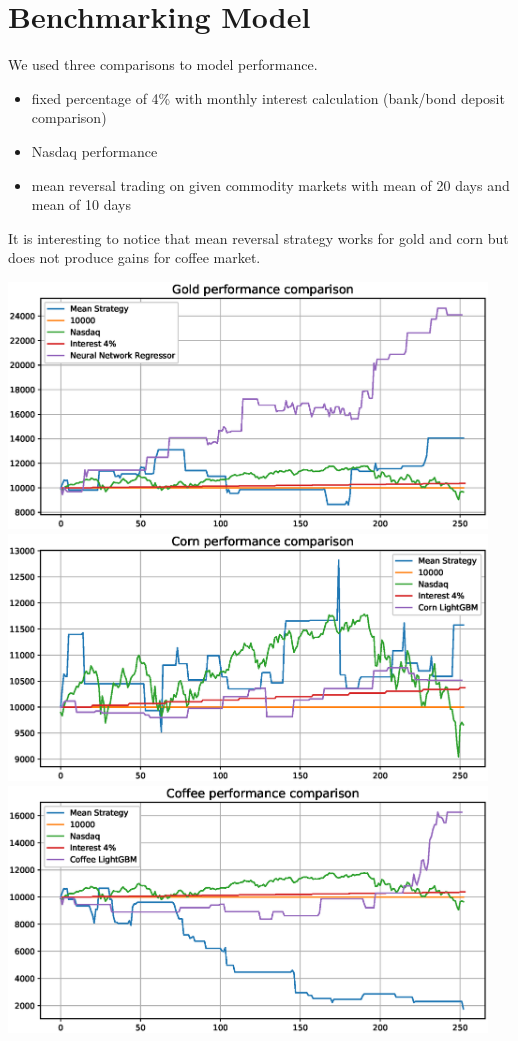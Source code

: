 \documentclass[final,2p]{elsarticle}
\begin{document}
\section{Benchmarking Model}

We used three comparisons to model performance.

\begin{itemize}
    \item fixed percentage of 4\% with monthly interest calculation (bank/bond deposit comparison)
    \item Nasdaq performance
    \item mean reversal trading on given commodity markets with mean of 20 days and mean of 10 days
\end{itemize}

It is interesting to notice that mean reversal strategy works for gold and corn but does not produce gains for coffee market.

\begin{center}
\includegraphics[width = 5in]{figures/gold_benchmark_performance.eps}
\includegraphics[width = 5in]{figures/corn_benchmark_performance.eps}
\includegraphics[width = 5in]{figures/coffee_benchmark_performance.eps}
\end{center}
\end{document}
